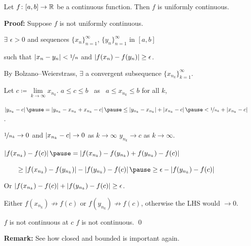 \documentclass[10pt,aspectratio=149]{beamer}
\begin{document}
\begin{frame}

\begin{theorem}
Let $f \colon [a,b] \to {\mathbb{R}}$ be a continuous function.  Then $f$
is uniformly continuous.
\end{theorem}

\pause
\textbf{Proof:}
Suppose $f$ is not uniformly continuous.

\pause
$\exists$ $\epsilon > 0$ and 
sequences
$\{ x_n \}_{n=1}^\infty$, $\{ y_n \}_{n=1}^\infty$ in $[a,b]$

such that
$\left\lvert {x_n-y_n} \right\rvert < \nicefrac{1}{n}$ and $\left\lvert {f(x_n)-f(y_n)} \right\rvert \geq
\epsilon$.

\pause
By Bolzano--Weierstrass,
$\exists$ a convergent subsequence $\{ x_{n_k} \}_{k=1}^\infty$.

\pause
Let $c \coloneqq \lim\limits_{k\to\infty} x_{n_k}$.
\pause
\quad
$a \leq c \leq b$~ as ~$a \leq x_{n_k} \leq b$ for all $k$,

\pause
\medskip

$
\abs{y_{n_k} - c}
\pause
=
\abs{y_{n_k} - x_{n_k} + x_{n_k} - c}
\pause
\leq
\abs{y_{n_k} - x_{n_k}}
+
\abs{x_{n_k}-c}
\pause
<
\nicefrac{1}{n_k} 
+
\abs{x_{n_k}-c}$.

\pause
\medskip

$\nicefrac{1}{n_k} \to 0$ and $\left\lvert {x_{n_k}-c} \right\rvert \to 0$ as $k \to \infty$
\pause
\wthus $y_{n_k} \to c$ as $k \to \infty$.

\pause
\medskip

$\abs{f(x_{n_k}) - f(c)}
\pause
=
\abs{f(x_{n_k}) - f(y_{n_k}) + f(y_{n_k}) - f(c)}$

\pause
\medskip

$\qquad \geq
\abs{f(x_{n_k}) - f(y_{n_k})} - \abs{f(y_{n_k}) - f(c)}
\pause
\geq
\epsilon - \abs{f(y_{n_k})-f(c)}$

\pause
\medskip

Or \qquad
$\left\lvert {f(x_{n_k})-f(c)} \right\rvert 
+
\left\lvert {f(y_{n_k})-f(c)} \right\rvert
\geq
\epsilon$.

\pause
\medskip

Either $f(x_{n_k}) \not\to f(c)$ or
$f(y_{n_k}) \not\to f(c)$, otherwise the LHS would $\to 0$.

\pause
\medskip

\thus \quad $f$ is not continuous at $c$
\pause
\wthus $f$ is not continuous.
\qed

\pause
\medskip

\textbf{Remark:} See how closed and bounded is important again.

\end{frame}
\end{document}
